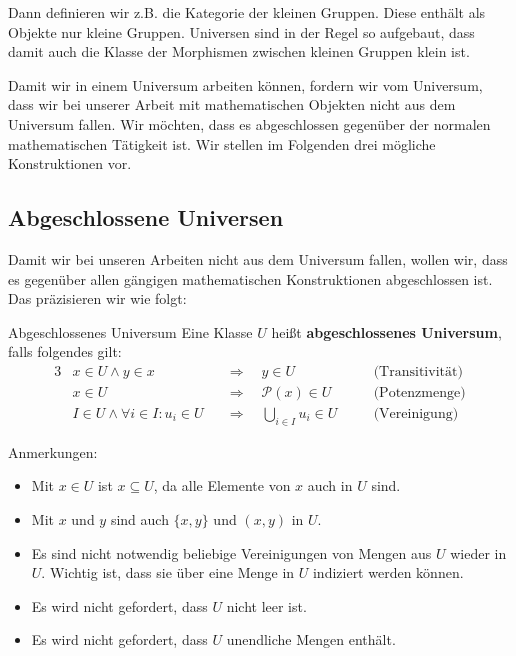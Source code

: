 \documentclass[a4paper]{amsart}
\theoremstyle{definition}
\newcommand{\PP}{\ensuremath{\mathcal{ P }}}
\begin{document}
Dann definieren wir z.B. die Kategorie der kleinen Gruppen. Diese enthält als Objekte nur kleine Gruppen. Universen sind in der Regel so aufgebaut, dass damit auch die Klasse der Morphismen zwischen kleinen Gruppen klein ist.

Damit wir in einem Universum arbeiten können, fordern wir vom Universum, dass wir bei unserer Arbeit mit mathematischen Objekten nicht aus dem Universum fallen. Wir möchten, dass es abgeschlossen gegenüber der normalen mathematischen Tätigkeit ist. Wir stellen im Folgenden drei mögliche Konstruktionen vor.

\subsection{Abgeschlossene Universen}
Damit wir bei unseren Arbeiten nicht aus dem Universum fallen, wollen wir, dass es gegenüber allen gängigen mathematischen Konstruktionen abgeschlossen ist. Das präzisieren wir wie folgt:
\begin{Definition}{Abgeschlossenes Universum}
   Eine Klasse $U$ heißt \textbf{abgeschlossenes Universum}, falls folgendes gilt:
   \begin{alignat}{3}
      &x \in U \land y \in x       &&\Rightarrow \quad y \in U      && \quad \text{(Transitivität)}\\
      &x \in U                     &&\Rightarrow \quad \PP(x) \in U && \quad \text{(Potenzmenge)}\\
      &I \in U \land \forall 
          i \in I \colon u_i \in U &&\Rightarrow \quad \bigcup_{i\in I} u_i \in U 
                                                               && \quad \text{(Vereinigung)}
   \end{alignat}
\end{Definition}
Anmerkungen:
\begin{itemize}
   \item Mit $x \in U$ ist $x \subseteq U$, da alle Elemente von $x$ auch in $U$ sind.
   \item Mit $x$ und $y$ sind auch $\{x, y\}$ und $(x,y)$ in $U$.
   \item Es sind nicht notwendig beliebige Vereinigungen von Mengen aus $U$ wieder in $U$. Wichtig ist, dass sie über eine Menge in $U$ indiziert werden können.
   \item Es wird nicht gefordert, dass $U$ nicht leer ist.
   \item Es wird nicht gefordert, dass $U$ unendliche Mengen enthält.
\end{itemize}
\end{document}
